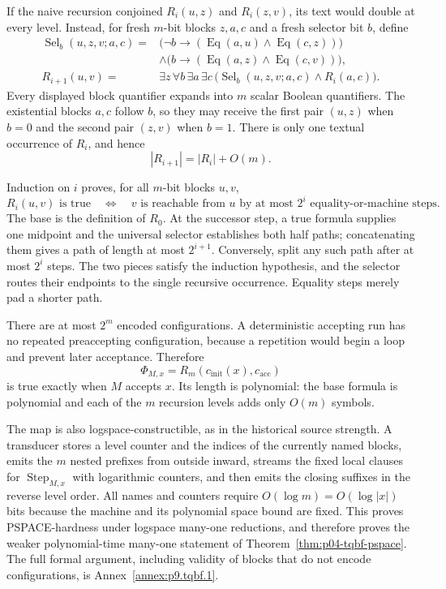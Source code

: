 If the naive recursion conjoined \(R_i(u,z)\) and \(R_i(z,v)\), its text would
double at every level.  Instead, for fresh \(m\)-bit blocks \(z,a,c\) and a
fresh selector bit \(b\), define
\[
\begin{aligned}
 \operatorname{Sel}_b(u,z,v;a,c)
  ={}&\bigl(\neg b\to
       (\operatorname{Eq}(a,u)\land\operatorname{Eq}(c,z))\bigr)\\
    &\land\bigl(b\to
       (\operatorname{Eq}(a,z)\land\operatorname{Eq}(c,v))\bigr),\\
 R_{i+1}(u,v)
  ={}&\exists z\,\forall b\,\exists a\,\exists c\,
       \bigl(\operatorname{Sel}_b(u,z,v;a,c)\land R_i(a,c)\bigr).
\end{aligned}
\]
Every displayed block quantifier expands into \(m\) scalar Boolean quantifiers.
The existential blocks \(a,c\) follow \(b\), so they may receive the first pair
\((u,z)\) when \(b=0\) and the second pair \((z,v)\) when \(b=1\).  There is
only one textual occurrence of \(R_i\), and hence
\[
 |R_{i+1}|=|R_i|+O(m).
\]

Induction on \(i\) proves, for all \(m\)-bit blocks \(u,v\),
\[
 R_i(u,v)\text{ is true}
 \quad\Longleftrightarrow\quad
 v\text{ is reachable from }u\text{ by at most }2^i
 \text{ equality-or-machine steps}.
\]
The base is the definition of \(R_0\).  At the successor step, a true formula
supplies one midpoint and the universal selector establishes both half paths;
concatenating them gives a path of length at most \(2^{i+1}\).  Conversely,
split any such path after at most \(2^i\) steps.  The two pieces satisfy the
induction hypothesis, and the selector routes their endpoints to the single
recursive occurrence.  Equality steps merely pad a shorter path.

There are at most \(2^m\) encoded configurations.  A deterministic accepting
run has no repeated preaccepting configuration, because a repetition would
begin a loop and prevent later acceptance.  Therefore
\[
 \Phi_{M,x}=R_m(c_{\mathrm{init}}(x),c_{\mathrm{acc}})
\]
is true exactly when \(M\) accepts \(x\).  Its length is polynomial: the base
formula is polynomial and each of the \(m\) recursion levels adds only
\(O(m)\) symbols.

The map is also logspace-constructible, as in the historical source strength.
A transducer stores a level counter and the indices of the currently named
blocks, emits the \(m\) nested prefixes from outside inward, streams the fixed
local clauses for \(\operatorname{Step}_{M,x}\) with logarithmic counters, and
then emits the closing suffixes in the reverse level order.  All names and
counters require \(O(\log m)=O(\log|x|)\) bits because the machine and its
polynomial space bound are fixed.  This proves PSPACE-hardness under logspace
many-one reductions, and therefore proves the weaker polynomial-time
many-one statement of Theorem~\ref{thm:p04-tqbf-pspace}.  The full formal
argument, including validity of blocks that do not encode configurations, is
Annex~\ref{annex:p9.tqbf.1}.

